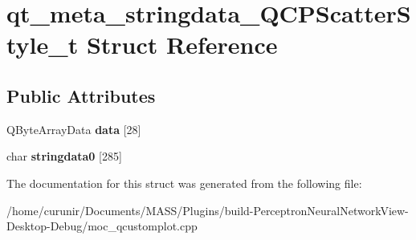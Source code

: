 \hypertarget{structqt__meta__stringdata___q_c_p_scatter_style__t}{}\section{qt\+\_\+meta\+\_\+stringdata\+\_\+\+Q\+C\+P\+Scatter\+Style\+\_\+t Struct Reference}
\label{structqt__meta__stringdata___q_c_p_scatter_style__t}
\subsection*{Public Attributes}
\begin{DoxyCompactItemize}
\item 
Q\+Byte\+Array\+Data {\bfseries data} \mbox{[}28\mbox{]}\hypertarget{structqt__meta__stringdata___q_c_p_scatter_style__t_acb6d48bc3c9529aa0eecc8d37930f3c6}{}\label{structqt__meta__stringdata___q_c_p_scatter_style__t_acb6d48bc3c9529aa0eecc8d37930f3c6}

\item 
char {\bfseries stringdata0} \mbox{[}285\mbox{]}\hypertarget{structqt__meta__stringdata___q_c_p_scatter_style__t_a6689ed585bd8409634a978fad9b94c3a}{}\label{structqt__meta__stringdata___q_c_p_scatter_style__t_a6689ed585bd8409634a978fad9b94c3a}

\end{DoxyCompactItemize}


The documentation for this struct was generated from the following file\+:\begin{DoxyCompactItemize}
\item 
/home/curunir/\+Documents/\+M\+A\+S\+S/\+Plugins/build-\/\+Perceptron\+Neural\+Network\+View-\/\+Desktop-\/\+Debug/moc\+\_\+qcustomplot.\+cpp\end{DoxyCompactItemize}
